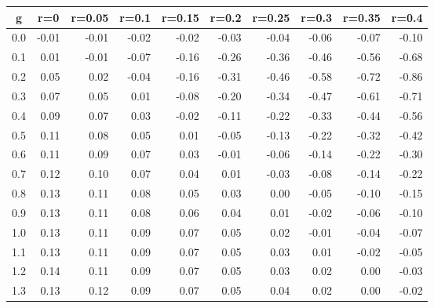 %
\begin{table}[!tbp]
 \begin{center}
 \begin{tabular}{rrrrrrrrrr}\hline\hline
\multicolumn{1}{c}{g}&\multicolumn{1}{c}{r=0}&\multicolumn{1}{c}{r=0.05}&\multicolumn{1}{c}{r=0.1}&\multicolumn{1}{c}{r=0.15}&\multicolumn{1}{c}{r=0.2}&\multicolumn{1}{c}{r=0.25}&\multicolumn{1}{c}{r=0.3}&\multicolumn{1}{c}{r=0.35}&\multicolumn{1}{c}{r=0.4}\tabularnewline
\hline
0.0&-0.01&-0.01&-0.02&-0.02&-0.03&-0.04&-0.06&-0.07&-0.10\tabularnewline
0.1& 0.01&-0.01&-0.07&-0.16&-0.26&-0.36&-0.46&-0.56&-0.68\tabularnewline
0.2& 0.05& 0.02&-0.04&-0.16&-0.31&-0.46&-0.58&-0.72&-0.86\tabularnewline
0.3& 0.07& 0.05& 0.01&-0.08&-0.20&-0.34&-0.47&-0.61&-0.71\tabularnewline
0.4& 0.09& 0.07& 0.03&-0.02&-0.11&-0.22&-0.33&-0.44&-0.56\tabularnewline
0.5& 0.11& 0.08& 0.05& 0.01&-0.05&-0.13&-0.22&-0.32&-0.42\tabularnewline
0.6& 0.11& 0.09& 0.07& 0.03&-0.01&-0.06&-0.14&-0.22&-0.30\tabularnewline
0.7& 0.12& 0.10& 0.07& 0.04& 0.01&-0.03&-0.08&-0.14&-0.22\tabularnewline
0.8& 0.13& 0.11& 0.08& 0.05& 0.03& 0.00&-0.05&-0.10&-0.15\tabularnewline
0.9& 0.13& 0.11& 0.08& 0.06& 0.04& 0.01&-0.02&-0.06&-0.10\tabularnewline
1.0& 0.13& 0.11& 0.09& 0.07& 0.05& 0.02&-0.01&-0.04&-0.07\tabularnewline
1.1& 0.13& 0.11& 0.09& 0.07& 0.05& 0.03& 0.01&-0.02&-0.05\tabularnewline
1.2& 0.14& 0.11& 0.09& 0.07& 0.05& 0.03& 0.02& 0.00&-0.03\tabularnewline
1.3& 0.13& 0.12& 0.09& 0.07& 0.05& 0.04& 0.02& 0.00&-0.02\tabularnewline
\hline
\end{tabular}

\end{center}

\end{table}

